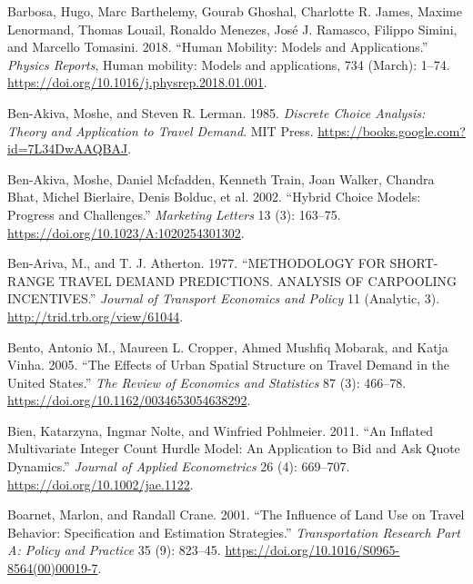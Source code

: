 \documentclass[
  11pt,
  openany]{memoir}
\newlength{\cslhangindent}
\newlength{\cslentryspacingunit} %
\newenvironment{CSLReferences}[2] %
 {%
  \setlength{\parindent}{0pt}
  \ifodd #1
  \let\oldpar\par
  \def\par{\hangindent=\cslhangindent\oldpar}
  \fi
  \setlength{\parskip}{#2\cslentryspacingunit}
 }%
 {}
\begin{document}
\begin{CSLReferences}{1}{0}
\leavevmode{}%
Barbosa, Hugo, Marc Barthelemy, Gourab Ghoshal, Charlotte R. James, Maxime Lenormand, Thomas Louail, Ronaldo Menezes, José J. Ramasco, Filippo Simini, and Marcello Tomasini. 2018. {``Human Mobility: Models and Applications.''} \emph{Physics Reports}, Human mobility: Models and applications, 734 (March): 1--74. \url{https://doi.org/10.1016/j.physrep.2018.01.001}.

\leavevmode{}%
Ben-Akiva, Moshe, and Steven R. Lerman. 1985. \emph{Discrete {Choice Analysis}: Theory and {Application} to {Travel Demand}}. {MIT Press}. \url{https://books.google.com?id=7L34DwAAQBAJ}.

\leavevmode{}%
Ben-Akiva, Moshe, Daniel Mcfadden, Kenneth Train, Joan Walker, Chandra Bhat, Michel Bierlaire, Denis Bolduc, et al. 2002. {``Hybrid {Choice Models}: Progress and {Challenges}.''} \emph{Marketing Letters} 13 (3): 163--75. \url{https://doi.org/10.1023/A:1020254301302}.

\leavevmode{}%
Ben-Ariva, M., and T. J. Atherton. 1977. {``{METHODOLOGY FOR SHORT}-{RANGE TRAVEL DEMAND PREDICTIONS}. {ANALYSIS OF CARPOOLING INCENTIVES}.''} \emph{Journal of Transport Economics and Policy} 11 (Analytic, 3). \url{http://trid.trb.org/view/61044}.

\leavevmode{}%
Bento, Antonio M., Maureen L. Cropper, Ahmed Mushfiq Mobarak, and Katja Vinha. 2005. {``The {Effects} of {Urban Spatial Structure} on {Travel Demand} in the {United States}.''} \emph{The Review of Economics and Statistics} 87 (3): 466--78. \url{https://doi.org/10.1162/0034653054638292}.

\leavevmode{}%
Bien, Katarzyna, Ingmar Nolte, and Winfried Pohlmeier. 2011. {``An Inflated Multivariate Integer Count Hurdle Model: An Application to Bid and Ask Quote Dynamics.''} \emph{Journal of Applied Econometrics} 26 (4): 669--707. \url{https://doi.org/10.1002/jae.1122}.

\leavevmode{}%
Boarnet, Marlon, and Randall Crane. 2001. {``The Influence of Land Use on Travel Behavior: Specification and Estimation Strategies.''} \emph{Transportation Research Part A: Policy and Practice} 35 (9): 823--45. \url{https://doi.org/10.1016/S0965-8564(00)00019-7}.


\end{CSLReferences}
\end{document}
